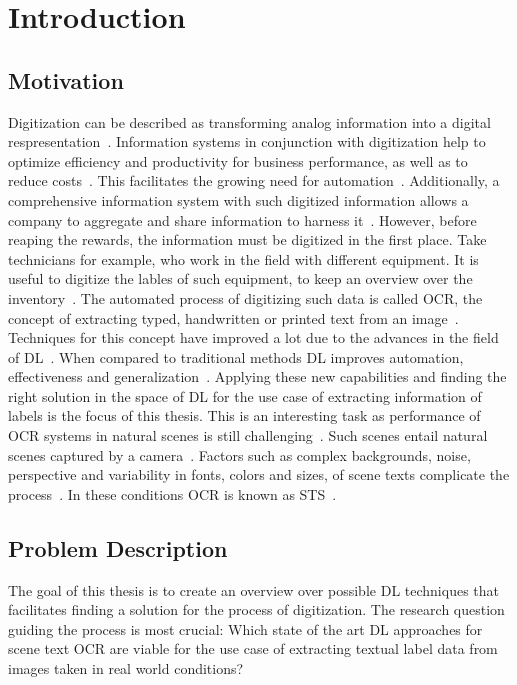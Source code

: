 \chapter{Introduction}\label{ch:intro}
\section{Motivation}
Digitization can be described as transforming analog information into a digital
respresentation~\citep{imgrund_approaching_2018}.
Information systems in conjunction with digitization help to optimize efficiency and productivity
for business performance, as well as to reduce costs~\citep{imgrund_approaching_2018}.
This facilitates the growing need for automation~\citep{imgrund_approaching_2018}.
Additionally, a comprehensive information system with such digitized information allows a company
to aggregate and share information to harness it~\citep{goodhue_impact_1992}.
However, before reaping the rewards, the information must be digitized in the first place.
Take technicians for example, who work in the field with different equipment.
It is useful to digitize the lables of such equipment, to keep an overview over the
inventory~\citep{abramowicz_business_2019}.
The automated process of digitizing such data is called \ac{OCR}, the concept of extracting typed,
handwritten or printed text from an image~\citep{zhao_improving_2020}.
Techniques for this concept have improved a lot due to the advances in the field of
\ac{DL}~\citep{zhao_improving_2020}.
When compared to traditional methods \ac{DL} improves automation, effectiveness and
generalization~\citep{chen_text_2021}.
Applying these new capabilities and finding the right solution in the space of \ac{DL} for the
use case of extracting information of labels is the focus of this thesis.
This is an interesting task as performance of \ac{OCR} systems in natural scenes is still
challenging~\citep{zhao_improving_2020, chen_text_2021}.
Such scenes entail natural scenes captured by a camera~\citep{chen_text_2021, baek_what_2019}.
Factors such as complex backgrounds, noise, perspective and variability in fonts, colors and sizes,
of scene texts complicate the process~\citep{hu_gtc_2020,chen_text_2021,baek_what_2019}.
In these conditions \ac{OCR} is known as \ac{STS}~\citep{long_scene_2021}.

\section{Problem Description}\label{se:problem}
The goal of this thesis is to create an overview over possible \ac{DL} techniques that facilitates
finding a solution for the process of digitization.
The research question guiding the process is most crucial:
Which state of the art \ac{DL} approaches for scene text \ac{OCR} are viable for the use case of
extracting textual label data from images taken in real world conditions?

